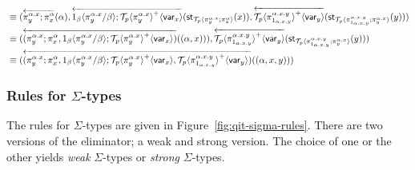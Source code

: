 \documentclass[10pt]{article}
\theoremstyle{definition}
\newcommand{\rewrite}[2]{\overleftarrow{#1}(#2)}
\newcommand\StI[2]{\ensuremath{\mathsf{st}_{#1}(#2)}}
\newcommand\ApEl[2]{\mathcal{T}_{#1}\langle#2\rangle}
\newcommand\ap[2]{\ensuremath{#1 \langle #2 \rangle }}
\newcommand\ApPlus[2]{\ensuremath{{#1}^+ \langle #2 \rangle }}
\begin{document}
\begin{align*}
&\equiv (\rewrite{\pi^{\alpha.x}_y;\pi^{\alpha}_x}{\alpha}, \rewrite{\ap{1_\beta}{\pi^{\alpha.x}_y/\beta};\ApPlus{\ApEl{p}{\pi^{\alpha.x}_y}}{\var{x}}}{\StI{\ApEl{p}{\pi^{\alpha.x}_y;\pi^{\alpha}_x}}{x}}, \rewrite{\ApPlus{\ApEl{p}{\pi^{\alpha.x.y}_{1_{\alpha.x.y}}}}{\var{y}}}{\StI{\ApEl{p}{\pi^{\alpha.x.y}_{1_{\alpha.x.y}};\pi^{\alpha.x}_y}}{y}})\\
&\equiv (\rewrite{(\pi^{\alpha.x}_y;\pi^{\alpha}_x,\ap{1_\beta}{\pi^{\alpha.x}_y/\beta};\ApPlus{\ApEl{p}{\pi^{\alpha.x}_y}}{\var{x}})}{(\alpha, x)}), \rewrite{\ApPlus{\ApEl{p}{\pi^{\alpha.x.y}_{1_{\alpha.x.y}}}}{\var{y}}}{\StI{\ApEl{p}{\pi^{\alpha.x.y}_{1_{\alpha.x.y}};\pi^{\alpha.x}_y}}{y}})\\
&\equiv (\rewrite{(\pi^{\alpha.x}_y;\pi^{\alpha}_x,\ap{1_\beta}{\pi^{\alpha.x}_y/\beta};\ApPlus{\ApEl{p}{\pi^{\alpha.x}_y}}{\var{x}}, \ApPlus{\ApEl{p}{\pi^{\alpha.x.y}_{1_{\alpha.x.y}}}}{\var{y}})}{(\alpha, x, y)})\\
\end{align*}

\subsubsection{Rules for $\Sigma$-types}
\newcommand\qpair[1]{\ensuremath{\mathsf{pair}_{#1}}}
\newcommand\qsplit[1]{\ensuremath{\mathsf{split}_{#1}}}
\newcommand\contract[1]{\ensuremath{\mathtt{contract}_{#1}}}
\newcommand\fibpair[1]{\ensuremath{\mathtt{fibpair}_{#1}}}
\newcommand\pair[1]{\ensuremath{\mathtt{pair}_{#1}}}
\newcommand\tsplit[1]{\ensuremath{\mathtt{split}_{#1}}}

The rules for $\Sigma$-types are given in Figure~\ref{fig:qit-sigma-rules}. There are two versions of the eliminator; a weak and strong version. The choice of one or the other yields \emph{weak} $\Sigma$-types or \emph{strong} $\Sigma$-types.
\end{document}
